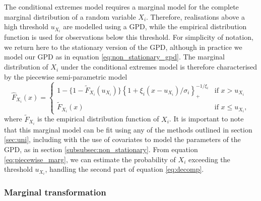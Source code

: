 \documentclass{article}
\numberwithin{equation}{section}
\begin{document}
The conditional extremes model requires a marginal model for the complete marginal distribution of a random variable $X_i$.
Therefore, realisations above a high threshold $u_{X_i}$ are modelled using a GPD, while the empirical distribution function is used for observations below this threshold.
For simplicity of notation, we return here to the stationary version of the GPD, although in practice we model our GPD as in equation \eqref{eq:non_stationary_gpd}.
The marginal distribution of $X_i$ under the conditional extremes model is therefore characterised by the piecewise semi-parametric model
\begin{equation} \label{eq:piecewise_marg}
  \hat{F}_{X_i}(x) = \begin{cases}
    1 - \{ 1 - \tilde{F}_{X_i}(u_{X_i})\} \left\{1 + \xi_{i}(x - u_{X_i})/\sigma_i\right\}_{+}^{-1/\xi_{i}} & \text{if } x > u_{X_i} \\
    \tilde{F}_{X_i}(x) & \text{if } x \le u_{X_i},
  \end{cases}
\end{equation}
where $\tilde{F}_{X_i}$ is the empirical distribution function of $X_i$.
It is important to note that this marginal model can be fit using any of the methods outlined in section \ref{sec:uni}, including with the use of covariates to model the parameters of the GPD, as in section \ref{subsubsec:non_stationary}.
From equation \ref{eq:piecewise_marg}, we can estimate the probability of $X_i$ exceeding the threshold $u_{X_i}$, handling the second part of equation \eqref{eq:decomp}. 

\subsubsection{Marginal transformation}

\end{document}
